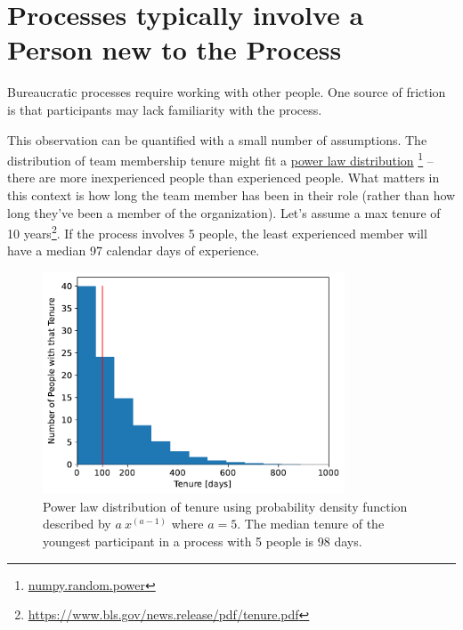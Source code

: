 \section{Processes typically involve a Person new to the Process}



Bureaucratic processes require working with other people. One source of friction is that participants may lack familiarity with the process. 

This observation can be quantified with a small number of assumptions. The distribution of team membership tenure might fit a \href{https://en.wikipedia.org/wiki/Power_law}{power law distribution}
\footnote{\href{https://numpy.org/doc/stable/reference/random/generated/numpy.random.power.html}{numpy.random.power}}
-- there are more inexperienced people than experienced people. What matters in this context is how long the team member has been in their role (rather than how long they've been a member of the organization). Let's assume a max tenure of 10 years\footnote{\href{https://www.bls.gov/news.release/pdf/tenure.pdf}{https://www.bls.gov/news.release/pdf/tenure.pdf}}. If the process involves 5 people, the least experienced member will have a median 97 calendar days of experience.

\begin{figure}[H]
    \centering
    \includegraphics[width=0.8\textwidth]{images/tenure_power_distribution_a5_with_max_tenure10_and_5_participants.pdf}
    \caption{Power law distribution of tenure using probability density function described by $a\ x^{(a-1)}$ where $a=5$. The median tenure of the youngest participant  in a process with 5 people is 98 days.}
    \label{fig:tenure-powerlaw-5-participants-tenure10}
\end{figure}


